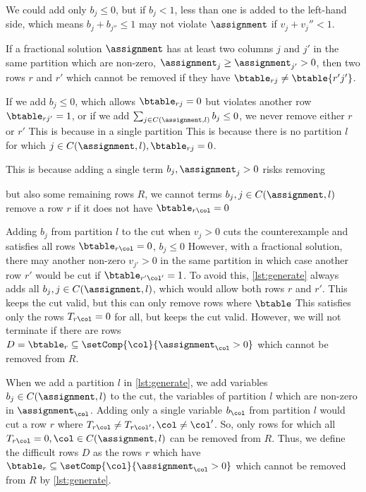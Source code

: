 {%
We could add only $b_j \leq 0$, but if $b_j<1$, less than one is added to the left-hand side, which means $b_j + b_{j''} \leq 1$ may not violate $\assignment$ if $v_j + v_j'' < 1$.



If a fractional solution $\assignment$ has at least two columns $j$ and $j'$ in the same partition which are non-zero, \ie $\assignment_j \geq \assignment_{j'}>0$, then two rows $r$ and $r'$ which cannot be removed if they have $\btable_{rj} \neq \btable{r'j'}$.




If we add $b_j \leq 0$, which allows $\btable_{rj}=0$ but violates another row $\btable_{rj'}=1$, or if we add $\sum_{j \in C(\assignment,l)}{b_j} \leq 0$, we never remove either $r$ or $r'$
This is because in a single partition
This is because there is no partition $l$ for which $j \in C(\assignment,l), \btable_{rj} = 0$.

This is because adding a single term $b_j, \assignment_j > 0$ risks removing 

but also some remaining rows $R$, we cannot terms $b_j, j \in C(\assignment,l)$ remove a row $r$ if it does not have $\btable_{r\col} = 0$

Adding $b_j$ from partition $l$ to the cut when $v_j>0$ cuts the counterexample and satisfies all rows $\btable_{r\col}=0$, \eg $b_j \leq 0$
However, with a fractional solution, there may another non-zero $v_{j'}>0$ in the same partition in which case another row $r'$ would be cut if $\btable_{r'\col'}=1$.
To avoid this, \cref{lst:generate} always adds all $b_j, j \in C(\assignment,l)$, which would allow both rows $r$ and $r'$.
This keeps the cut valid, but this can only remove rows where $\btable$
This satisfies only the rows $T_{r\col}=0$ for all, but keeps the cut valid.
However, we will not terminate if there are rows $D = \btable_{r} \subseteq \setComp{\col}{\assignment_\col>0}$ which cannot be removed from $R$.



When we add a partition $l$ in \cref{lst:generate}, we add variables $b_j \in C(\assignment,l)$ to the cut, \ie the variables of partition $l$ which are non-zero in $\assignment_\col$.
Adding only a single variable $b_\col$ from partition $l$ would cut a row $r$ where $T_{r\col} \neq T_{r\col'}, \col \neq \col'$.
So, only rows for which all $T_{r\col} = 0, \col \in C(\assignment,l)$ can be removed from $R$.
Thus, we define the difficult rows $D$ as the rows $r$ which have $\btable_{r} \subseteq \setComp{\col}{\assignment_\col>0}$ which cannot be removed from $R$ by \cref{lst:generate}.


}
